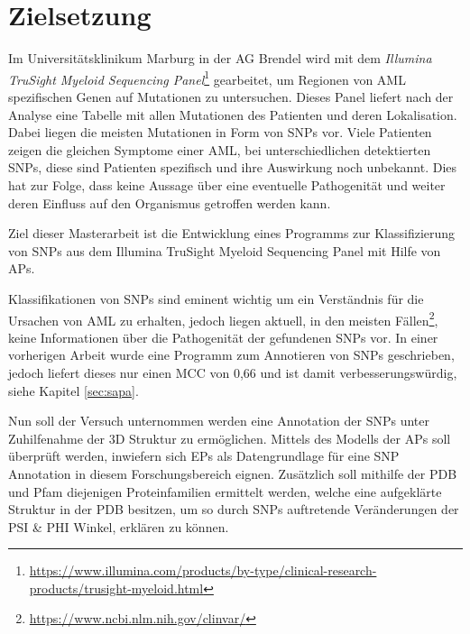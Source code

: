 \section{Zielsetzung}

Im Universitätsklinikum Marburg in der AG Brendel wird mit dem \emph{Illumina TruSight Myeloid Sequencing Panel}\footnote{\url{https://www.illumina.com/products/by-type/clinical-research-products/trusight-myeloid.html}} gearbeitet, um Regionen von \ac{AML} spezifischen Genen auf Mutationen zu untersuchen. Dieses Panel liefert nach der Analyse eine Tabelle mit allen Mutationen des Patienten und deren Lokalisation. Dabei liegen die meisten Mutationen in Form von \ac{SNP}s vor. Viele Patienten zeigen die gleichen Symptome einer \ac{AML}, bei unterschiedlichen detektierten \ac{SNP}s, diese sind Patienten spezifisch und ihre Auswirkung noch unbekannt. Dies hat zur Folge, dass keine Aussage über eine eventuelle Pathogenität und weiter deren Einfluss auf den Organismus getroffen werden kann. 

Ziel dieser Masterarbeit ist die Entwicklung eines Programms zur Klassifizierung von \ac{SNP}s aus dem Illumina TruSight Myeloid Sequencing Panel mit Hilfe von \ac{APs}.

Klassifikationen von \ac{SNP}s sind eminent wichtig um ein Verständnis für die Ursachen von \ac{AML} zu erhalten, jedoch liegen aktuell, in den meisten Fällen\footnote{\url{https://www.ncbi.nlm.nih.gov/clinvar/}}, keine Informationen über die Pathogenität der gefundenen \ac{SNP}s vor. In einer vorherigen Arbeit wurde eine Programm zum Annotieren von \ac{SNP}s geschrieben, jedoch liefert dieses nur einen \ac{MCC} von 0,66 und ist damit verbesserungswürdig, siehe Kapitel \ref{sec:sapa}. 

Nun soll der Versuch unternommen werden eine Annotation der \ac{SNP}s unter Zuhilfenahme der 3D Struktur zu ermöglichen. Mittels des Modells der \ac{APs} soll überprüft werden, inwiefern sich \ac{EP}s als Datengrundlage für eine \ac{SNP} Annotation in diesem Forschungsbereich eignen. Zusätzlich soll mithilfe der \ac{PDB} und \ac{Pfam} diejenigen Proteinfamilien ermittelt werden, welche eine aufgeklärte Struktur in der \ac{PDB} besitzen, um so durch \ac{SNP}s auftretende Veränderungen der PSI \& PHI Winkel, erklären zu können. 



